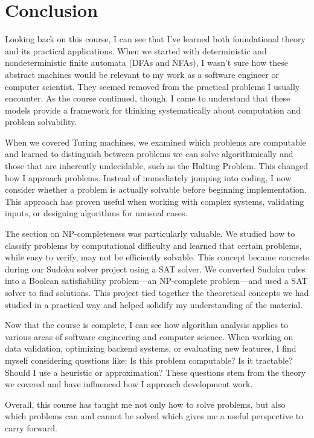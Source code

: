 \documentclass{article}
\theoremstyle{theorem}
\theoremstyle{definition}
\theoremstyle{remark}
\begin{document}
\section{Conclusion}\label{conclusion}
Looking back on this course, I can see that I've learned both foundational theory and its practical applications. When we started with deterministic and nondeterministic finite automata (DFAs and NFAs), I wasn't sure how these abstract machines would be relevant to my work as a software engineer or computer scientist. They seemed removed from the practical problems I usually encounter. As the course continued, though, I came to understand that these models provide a framework for thinking systematically about computation and problem solvability.

When we covered Turing machines, we examined which problems are computable and learned to distinguish between problems we can solve algorithmically and those that are inherently undecidable, such as the Halting Problem. This changed how I approach problems. Instead of immediately jumping into coding, I now consider whether a problem is actually solvable before beginning implementation. This approach has proven useful when working with complex systems, validating inputs, or designing algorithms for unusual cases.

The section on NP-completeness was particularly valuable. We studied how to classify problems by computational difficulty and learned that certain problems, while easy to verify, may not be efficiently solvable. This concept became concrete during our Sudoku solver project using a SAT solver. We converted Sudoku rules into a Boolean satisfiability problem—an NP-complete problem—and used a SAT solver to find solutions. This project tied together the theoretical concepts we had studied in a practical way and helped solidify my understanding of the material.

Now that the course is complete, I can see how algorithm analysis applies to various areas of software engineering and computer science. When working on data validation, optimizing backend systems, or evaluating new features, I find myself considering questions like: Is this problem computable? Is it tractable? Should I use a heuristic or approximation? These questions stem from the theory we covered and have influenced how I approach development work.

Overall, this course has taught me not only how to solve problems, but also which problems can and cannot be solved which gives me a useful perspective to carry forward.
\end{document}
